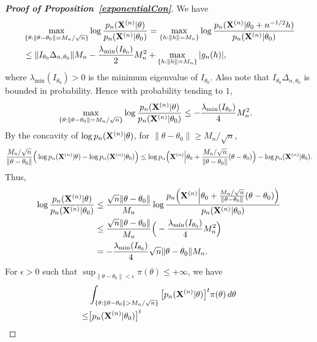 \documentclass[11pt]{article}
\theoremstyle{plain}
\theoremstyle{definition}
\theoremstyle{remark}
\begin{document}
\begin{appendices}
\begin{proof}[\textbf{Proof of Proposition~\ref{exponentialCon}}]
    We have
    $$
    \begin{aligned}
        &\max_{\{\theta:\|\theta-\theta_0\|=M_n/\sqrt{n}\}}
    \log\frac{p_n(\BX^{(n)}|\theta)}{p_n(\BX^{(n)}|\theta_0)}
    =
    \max_{\{h:\|h\|=M_n\}}
    \log\frac{p_n(\BX^{(n)}|\theta_0+n^{-1/2}h)}{p_n(\BX^{(n)}|\theta_0)}
        \\
        &\leq
         \|I_{\theta_0}\Delta_{n,\theta_0}\| M_n -\frac{\lambda_{\min}(I_{\theta_0})}{2} M_n^2+
        \max_{\{h:\|h\|=M_n\}}|g_n(h)|,
    \end{aligned}
    $$
    where $\lambda_{\min}(I_{\theta_0})>0$ is the minimum eigenvalue of $I_{\theta_0}$.
    Also note that $I_{\theta_0}\Delta_{n,\theta_0}$ is bounded in probability. Hence with probability tending to $1$,
    $$
    \begin{aligned}
        &\max_{\{\theta:\|\theta-\theta_0\|=M_n/\sqrt{n}\}}
    \log\frac{p_n(\BX^{(n)}|\theta)}{p_n(\BX^{(n)}|\theta_0)}
        \leq 
        -\frac{\lambda_{\min}(I_{\theta_0})}{4}M_n^2.
    \end{aligned} 
    $$
    By the concavity of $\log p_n(\BX^{(n)}|\theta)$, for $\|\theta-\theta_0\|\geq M_n/\sqrt{n}$,
    $$
     \frac{M_n/\sqrt{n}}{\|\theta-\theta_0\|}
     \Big(
     \log p_n(\BX^{(n)}|\theta)-\log p_n(\BX^{(n)}|\theta_0)
     \Big)
     \leq
     \log p_n \Big(\BX^{(n)}\Big|\theta_0+\frac{M_n/\sqrt{n}}{\|\theta-\theta_0\|}(\theta-\theta_0)\Big)-\log p_n(\BX^{(n)}|\theta_0).
    $$
    Thus,
    $$
    \begin{aligned}
     \log \frac{p_n(\BX^{(n)}|\theta)}{ p_n(\BX^{(n)}|\theta_0)}
        &\leq
        \frac{\sqrt{n}\|\theta-\theta_0\|}{M_n}
     \log \frac{p_n\Big(\BX^{(n)}\Big|\theta_0+\frac{M_n/\sqrt{n}}{\|\theta-\theta_0\|}(\theta-\theta_0)\Big)}{ p_n(\BX^{(n)}|\theta_0)}
        \\
        &\leq
        \frac{\sqrt{n}\|\theta-\theta_0\|}{M_n}
        \Big(-\frac{\lambda_{\min}(I_{\theta_0})}{4}M_n^2\Big)
        \\
        &=
        -\frac{\lambda_{\min}(I_{\theta_0})}{4}\sqrt{n}\|\theta-\theta_0\|
        M_n.
    \end{aligned}
    $$
    For $\epsilon>0$ such that $\sup_{\|\theta-\theta_0\|< \epsilon}\pi(\theta)\leq +\infty $, we have
$$
    \begin{aligned}
        &\int_{\{\theta:\|\theta-\theta_0\|> M_n/\sqrt{n}\}} \big[p_n(\BX^{(n)}|\theta)\big]^t \pi(\theta)\, d\theta
        \\
        \leq&
        \big[p_n(\BX^{(n)}|\theta_0)\big]^t 

\end{aligned}$$
\end{proof}
\end{appendices}
\end{document}
